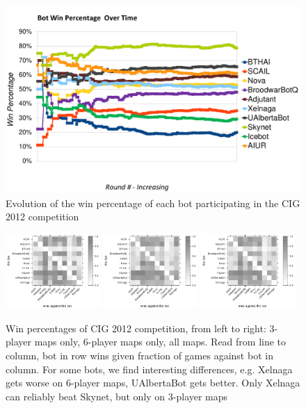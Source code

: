 \documentclass[journal]{IEEEtran}
\begin{document}
\begin{figure}[t]
    \centering
    \includegraphics[width=\columnwidth]{figures/cig2012-ResultsRound90.pdf}
    \caption{Evolution of the win percentage of each bot participating in the
CIG 2012 competition}
    \label{fig:cig2012-results}
\end{figure}

\begin{figure}[b]
    \centering
    \includegraphics[width=0.32\textwidth]{figures/vstable3.pdf}
    \includegraphics[width=0.32\textwidth]{figures/vstable6.pdf}
    \includegraphics[width=0.32\textwidth]{figures/vstable.pdf}
    \caption{Win percentages of CIG 2012 competition, from left
    to right: 3-player maps only, 6-player maps only, all maps.
    Read from line to column, bot in row wins given fraction of
    games against bot in column. For some bots, we find interesting
    differences, e.g. Xelnaga gets worse on 6-player maps, UAlbertaBot
    gets better. Only Xelnaga can reliably beat Skynet, but only on 
    3-player maps}
    \label{fig:cig2012-mapresults}
\end{figure}
\end{document}
